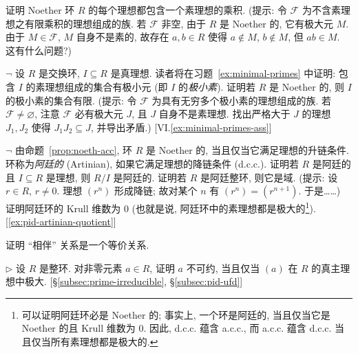 \begin{prob}
\label{ex:noeth-ideal-prime-product}
证明 Noether 环 $R$ 的每个理想都包含一个素理想的乘积. (提示: 令 $\mathcal{F}$ 为不含素理想之有限乘积的理想组成的族. 若 $\mathcal{F}$ 非空, 由于 $R$ 是 Noether 的, 它有极大元 $M$. 由于 $M\in\mathcal{F}$, $M$ 自身不是素的, 故存在 $a,b\in R$ 使得 $a\notin M$, $b\notin M$, 但 $ab\in M$. 这有什么问题?)
\end{prob}

\begin{prob}
\label{ex:min-primes-finite}
$\neg$ 设 $R$ 是交换环, $I\subseteq R$ 是真理想. 读者将在习题~\ref{ex:minimal-primes} 中证明: 包含 $I$ 的素理想组成的集合有极小元 (即 $I$ 的\emph{极小素}). 证明若 $R$ 是 Noether 的, 则 $I$ 的极小素的集合有限. (提示: 令 $\mathcal{F}$ 为具有无穷多个极小素的理想组成的族. 若 $\mathcal{F}\neq\varnothing$, 注意 $\mathcal{F}$ 必有极大元 $J$, 且 $J$ 自身不是素理想. 找出严格大于 $J$ 的理想 $J_1,J_2$ 使得 $J_1 J_2\subseteq J$, 并导出矛盾.) [VI.\ref{ex:minimal-primes-ass}]
\end{prob}

\begin{prob}
\label{ex:artinian}
$\neg$ 由命题~\ref{prop:noeth-acc}, 环 $R$ 是 Noether 的, 当且仅当它满足理想的升链条件. 环称为\emph{阿廷的} (Artinian), 如果它满足理想的降链条件 (d.c.c.). 证明若 $R$ 是阿廷的且 $I\subseteq R$ 是理想, 则 $R/I$ 是阿廷的. 证明若 $R$ 是阿廷整环, 则它是域. (提示: 设 $r\in R$, $r\neq 0$. 理想 $(r^n)$ 形成降链; 故对某个 $n$ 有 $(r^n) = (r^{n+1})$. 于是……) 证明阿廷环的 Krull 维数为 $0$ (也就是说, 阿廷环中的素理想都是极大的\footnote{可以证明阿廷环必是 Noether 的; 事实上, 一个环是阿廷的, 当且仅当它是 Noether 的且 Krull 维数为 $0$. 因此, d.c.c. 蕴含 a.c.c., 而 a.c.c. 蕴含 d.c.c. 当且仅当所有素理想都是极大的.}). [\ref{ex:pid-artinian-quotient}]
\end{prob}

\begin{prob}
\label{ex:associate-equiv}
证明 ``相伴'' 关系是一个等价关系.
\end{prob}

\begin{prob}
\label{ex:irred-maximal-principal}
$\triangleright$ 设 $R$ 是整环. 对非零元素 $a\in R$, 证明 $a$ 不可约, 当且仅当 $(a)$ 在 $R$ 的真主理想中极大. [§\ref{subsec:prime-irreducible}, §\ref{subsec:pid-ufd}]
\end{prob}

